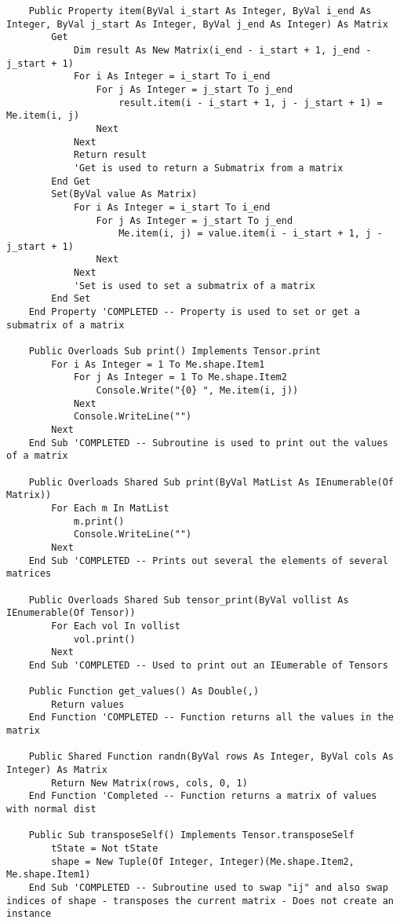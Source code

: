 \begin{verbatim}
    Public Property item(ByVal i_start As Integer, ByVal i_end As Integer, ByVal j_start As Integer, ByVal j_end As Integer) As Matrix
        Get
            Dim result As New Matrix(i_end - i_start + 1, j_end - j_start + 1)
            For i As Integer = i_start To i_end
                For j As Integer = j_start To j_end
                    result.item(i - i_start + 1, j - j_start + 1) = Me.item(i, j)
                Next
            Next
            Return result
            'Get is used to return a Submatrix from a matrix
        End Get
        Set(ByVal value As Matrix)
            For i As Integer = i_start To i_end
                For j As Integer = j_start To j_end
                    Me.item(i, j) = value.item(i - i_start + 1, j - j_start + 1)
                Next
            Next
            'Set is used to set a submatrix of a matrix
        End Set
    End Property 'COMPLETED -- Property is used to set or get a submatrix of a matrix

    Public Overloads Sub print() Implements Tensor.print
        For i As Integer = 1 To Me.shape.Item1
            For j As Integer = 1 To Me.shape.Item2
                Console.Write("{0} ", Me.item(i, j))
            Next
            Console.WriteLine("")
        Next
    End Sub 'COMPLETED -- Subroutine is used to print out the values of a matrix

    Public Overloads Shared Sub print(ByVal MatList As IEnumerable(Of Matrix))
        For Each m In MatList
            m.print()
            Console.WriteLine("")
        Next
    End Sub 'COMPLETED -- Prints out several the elements of several matrices

    Public Overloads Shared Sub tensor_print(ByVal vollist As IEnumerable(Of Tensor))
        For Each vol In vollist
            vol.print()
        Next
    End Sub 'COMPLETED -- Used to print out an IEumerable of Tensors

    Public Function get_values() As Double(,)
        Return values
    End Function 'COMPLETED -- Function returns all the values in the matrix

    Public Shared Function randn(ByVal rows As Integer, ByVal cols As Integer) As Matrix
        Return New Matrix(rows, cols, 0, 1)
    End Function 'Completed -- Function returns a matrix of values with normal dist

    Public Sub transposeSelf() Implements Tensor.transposeSelf
        tState = Not tState
        shape = New Tuple(Of Integer, Integer)(Me.shape.Item2, Me.shape.Item1)
    End Sub 'COMPLETED -- Subroutine used to swap "ij" and also swap indices of shape - transposes the current matrix - Does not create an instance


\end{verbatim}
